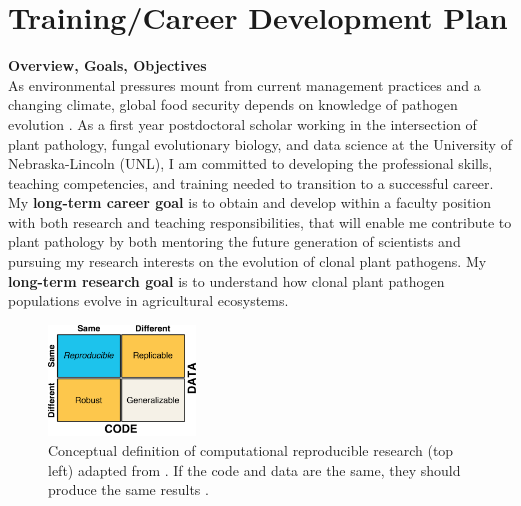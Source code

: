 \documentclass[12pt,letterpaper]{article}
\title{\ruleline{Project Narrative}}
\begin{document}
\maketitle


\section{Training/Career Development Plan}
\noindent \textbf{Overview, Goals, Objectives}\\
As environmental pressures mount from current management practices and a changing climate, global food security depends on knowledge of pathogen evolution \citep{croll2016genetic,grunwald2016population,stukenbrock2013evolution}. 
As a first year postdoctoral scholar working in the intersection of plant pathology, fungal evolutionary biology, and data science at the University of Nebraska-Lincoln (UNL), I am committed to developing the professional skills, teaching competencies, and training needed to transition to a successful career. 
My \textbf{long-term career goal} is to obtain and develop within a faculty position with both research and teaching responsibilities, that will enable me contribute to plant pathology by both mentoring the future generation of scientists and pursuing my research interests on the evolution of clonal plant pathogens. 
My \textbf{long-term research goal} is to understand how clonal plant pathogen populations evolve in agricultural ecosystems. 
\begin{figure}
  \includegraphics[width=0.35\textwidth]{figure/whitaker2017publishing.pdf}
  \caption{Conceptual definition of computational reproducible research (top left) adapted from \citet{whitaker2017publishing}. If the code and data are the same, they should produce the same results \citep{patil2016statistical}.
  }
  \label{fig:rr-def}
\end{figure}
\end{document}
